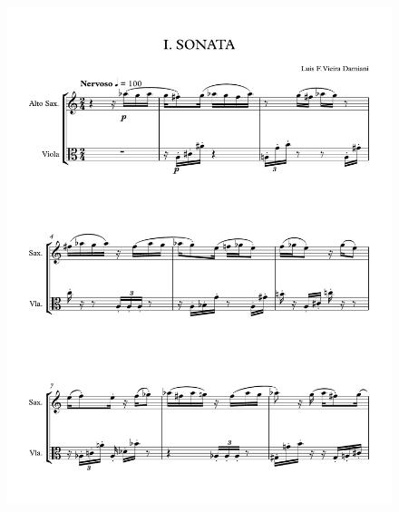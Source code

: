 \begin{figure}[h!]
    \centering
	\includegraphics[width=6.5in]{figures/Sax_Viola_1.pdf}
\end{figure}

